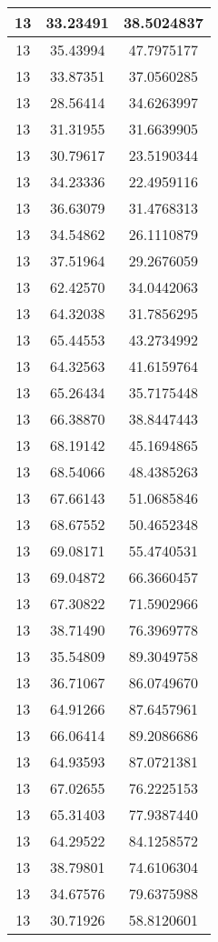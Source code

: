 \documentclass[
]{book}
\begin{document}
\begin{tabular}{c|c|c}
\hline
13 & 33.23491 & 38.5024837\\
\hline
13 & 35.43994 & 47.7975177\\
\hline
13 & 33.87351 & 37.0560285\\
\hline
13 & 28.56414 & 34.6263997\\
\hline
13 & 31.31955 & 31.6639905\\
\hline
13 & 30.79617 & 23.5190344\\
\hline
13 & 34.23336 & 22.4959116\\
\hline
13 & 36.63079 & 31.4768313\\
\hline
13 & 34.54862 & 26.1110879\\
\hline
13 & 37.51964 & 29.2676059\\
\hline
13 & 62.42570 & 34.0442063\\
\hline
13 & 64.32038 & 31.7856295\\
\hline
13 & 65.44553 & 43.2734992\\
\hline
13 & 64.32563 & 41.6159764\\
\hline
13 & 65.26434 & 35.7175448\\
\hline
13 & 66.38870 & 38.8447443\\
\hline
13 & 68.19142 & 45.1694865\\
\hline
13 & 68.54066 & 48.4385263\\
\hline
13 & 67.66143 & 51.0685846\\
\hline
13 & 68.67552 & 50.4652348\\
\hline
13 & 69.08171 & 55.4740531\\
\hline
13 & 69.04872 & 66.3660457\\
\hline
13 & 67.30822 & 71.5902966\\
\hline
13 & 38.71490 & 76.3969778\\
\hline
13 & 35.54809 & 89.3049758\\
\hline
13 & 36.71067 & 86.0749670\\
\hline
13 & 64.91266 & 87.6457961\\
\hline
13 & 66.06414 & 89.2086686\\
\hline
13 & 64.93593 & 87.0721381\\
\hline
13 & 67.02655 & 76.2225153\\
\hline
13 & 65.31403 & 77.9387440\\
\hline
13 & 64.29522 & 84.1258572\\
\hline
13 & 38.79801 & 74.6106304\\
\hline
13 & 34.67576 & 79.6375988\\
\hline
13 & 30.71926 & 58.8120601\\

\end{tabular}
\end{document}
